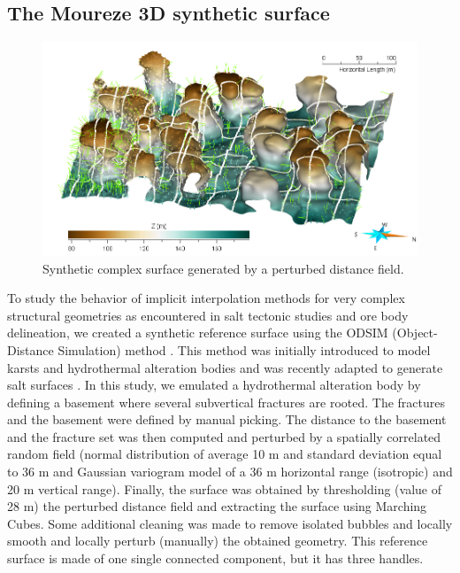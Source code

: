 \documentclass[preprint]{ring20}
\begin{document}
\subsection{The Moureze 3D synthetic surface}
\label{sec:Moureze}


\begin{figure}
\centering\includegraphics[width=\textwidth]{Moureze}
\caption{Synthetic complex surface generated by a perturbed distance field.}
\label{fig:Moureze}
\end{figure}

To study the behavior of implicit interpolation methods for very complex structural geometries as encountered in salt tectonic studies and ore body delineation, we created a synthetic reference surface using the ODSIM (Object-Distance Simulation) method \citep{Henrion2010MG}. This method was initially introduced to model karsts and hydrothermal alteration bodies \citep{Henrion2008PEIGC,Rongier2014G} and was recently adapted to generate salt surfaces \citep{Clausolles20188ECE2}. In this study, we emulated a hydrothermal alteration body by defining a basement where several subvertical fractures are rooted. The fractures and the basement were defined by manual picking. The distance to the basement and the fracture set was then computed and perturbed by a spatially correlated random field (normal distribution of average 10 m and standard deviation equal to 36 m and Gaussian variogram model of a 36 m horizontal range (isotropic) and 20 m vertical range). Finally, the surface was obtained 
by thresholding (value of 28 m) the perturbed distance field and extracting the surface using Marching Cubes. Some additional cleaning was made to remove isolated bubbles and locally smooth and locally perturb (manually) the obtained geometry. This reference surface is made of one single connected component, but it has three handles. 
\end{document}
